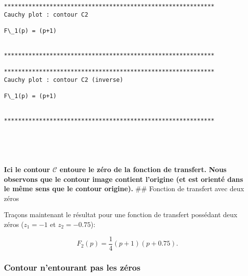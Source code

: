     \begin{Verbatim}[commandchars=\\\{\}]
************************************************************
Cauchy plot : contour C2

F\_1(p) = (p+1)


************************************************************

************************************************************
Cauchy plot : contour C2 (inverse)

F\_1(p) = (p+1)


************************************************************

    \end{Verbatim}

    \begin{center}
    \end{center}
    { \hspace*{\fill} \\}
    
    \begin{center}
    \end{center}
    { \hspace*{\fill} \\}
    
    \textbf{Ici le contour \(\mathcal{C}\) entoure le zéro de la fonction de
transfert. Nous observons que le contour image contient l'origine (et
est orienté dans le même sens que le contour origine).} \#\# Fonction de
transfert avec deux zéros

Traçons maintenant le résultat pour une fonction de transfert possédant
deux zéros (\(z_1=-1\) et \(z_2=-0.75\)):

\[
F_2(p)=\dfrac{1}{4}(p+1)(p+0.75).
\]

\hypertarget{contour-nentourant-pas-les-zuxe9ros}{%
\subsubsection{Contour n'entourant pas les
zéros}\label{contour-nentourant-pas-les-zuxe9ros}}

